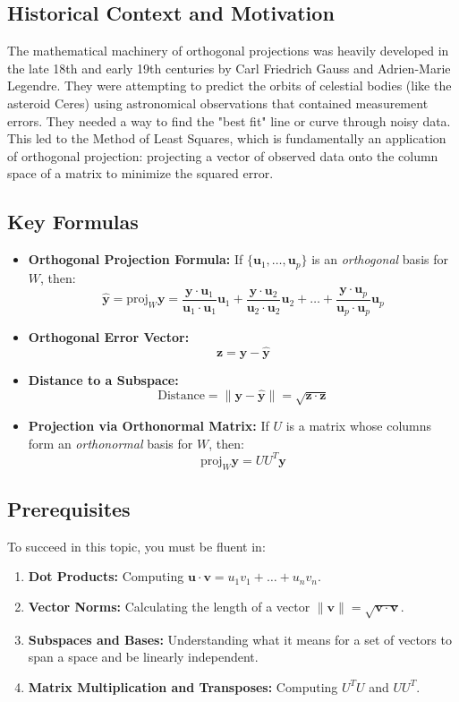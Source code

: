 \documentclass[11pt, letterpaper]{article}
\theoremstyle{definition}
\theoremstyle{remark}
\begin{document}
\subsection{Historical Context and Motivation}
The mathematical machinery of orthogonal projections was heavily developed in the late 18th and early 19th centuries by Carl Friedrich Gauss and Adrien-Marie Legendre. They were attempting to predict the orbits of celestial bodies (like the asteroid Ceres) using astronomical observations that contained measurement errors. They needed a way to find the "best fit" line or curve through noisy data. This led to the Method of Least Squares, which is fundamentally an application of orthogonal projection: projecting a vector of observed data onto the column space of a matrix to minimize the squared error.

\subsection{Key Formulas}
\begin{itemize}
    \item \textbf{Orthogonal Projection Formula:} If $\{\mathbf{u}_1, \dots, \mathbf{u}_p\}$ is an \textit{orthogonal} basis for $W$, then:
    \[ \hat{\mathbf{y}} = \text{proj}_W \mathbf{y} = \frac{\mathbf{y} \cdot \mathbf{u}_1}{\mathbf{u}_1 \cdot \mathbf{u}_1}\mathbf{u}_1 + \frac{\mathbf{y} \cdot \mathbf{u}_2}{\mathbf{u}_2 \cdot \mathbf{u}_2}\mathbf{u}_2 + \dots + \frac{\mathbf{y} \cdot \mathbf{u}_p}{\mathbf{u}_p \cdot \mathbf{u}_p}\mathbf{u}_p \]
    \item \textbf{Orthogonal Error Vector:} 
    \[ \mathbf{z} = \mathbf{y} - \hat{\mathbf{y}} \]
    \item \textbf{Distance to a Subspace:} 
    \[ \text{Distance} = \|\mathbf{y} - \hat{\mathbf{y}}\| = \sqrt{\mathbf{z} \cdot \mathbf{z}} \]
    \item \textbf{Projection via Orthonormal Matrix:} If $U$ is a matrix whose columns form an \textit{orthonormal} basis for $W$, then:
    \[ \text{proj}_W \mathbf{y} = U U^T \mathbf{y} \]
\end{itemize}

\subsection{Prerequisites}
To succeed in this topic, you must be fluent in:
\begin{enumerate}
    \item \textbf{Dot Products:} Computing $\mathbf{u} \cdot \mathbf{v} = u_1v_1 + \dots + u_nv_n$.
    \item \textbf{Vector Norms:} Calculating the length of a vector $\|\mathbf{v}\| = \sqrt{\mathbf{v} \cdot \mathbf{v}}$.
    \item \textbf{Subspaces and Bases:} Understanding what it means for a set of vectors to span a space and be linearly independent.
    \item \textbf{Matrix Multiplication and Transposes:} Computing $U^T U$ and $U U^T$.
\end{enumerate}
\end{document}
